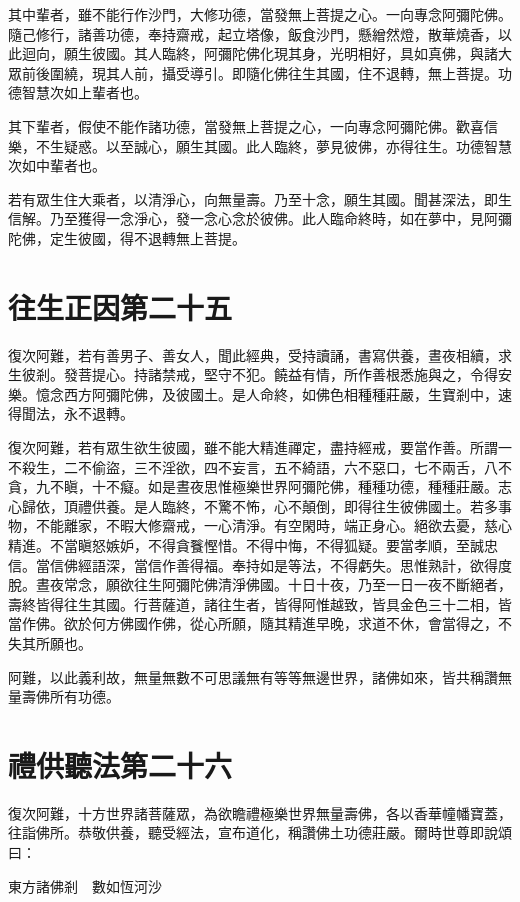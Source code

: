 \documentclass{zhvt-classic}
\begin{document}
其中輩者，雖不能行作沙門，大修功德，當發無上菩提之心。一向專念阿彌陀佛。隨己修行，諸善功德，奉持齋戒，起立塔像，飯食沙門，懸繒然燈，散華燒香，以此迴向，願生彼國。其人臨終，阿彌陀佛化現其身，光明相好，具如真佛，與諸大眾前後圍繞，現其人前，攝受導引。即隨化佛往生其國，住不退轉，無上菩提。功德智慧次如上輩者也。

其下輩者，假使不能作諸功德，當發無上菩提之心，一向專念阿彌陀佛。歡喜信樂，不生疑惑。以至誠心，願生其國。此人臨終，夢見彼佛，亦得往生。功德智慧次如中輩者也。

若有眾生住大乘者，以清淨心，向無量壽。乃至十念，願生其國。聞甚深法，即生信解。乃至獲得一念淨心，發一念心念於彼佛。此人臨命終時，如在夢中，見阿彌陀佛，定生彼國，得不退轉無上菩提。

\chapter*{往生正因第二十五}

復次阿難，若有善男子、善女人，聞此經典，受持讀誦，書寫供養，晝夜相續，求生彼剎。發菩提心。持諸禁戒，堅守不犯。饒益有情，所作善根悉施與之，令得安樂。憶念西方阿彌陀佛，及彼國土。是人命終，如佛色相種種莊嚴，生寶剎中，速得聞法，永不退轉。

復次阿難，若有眾生欲生彼國，雖不能大精進禪定，盡持經戒，要當作善。所謂一不殺生，二不偷盜，三不淫欲，四不妄言，五不綺語，六不惡口，七不兩舌，八不貪，九不瞋，十不癡。如是晝夜思惟極樂世界阿彌陀佛，種種功德，種種莊嚴。志心歸依，頂禮供養。是人臨終，不驚不怖，心不顛倒，即得往生彼佛國土。若多事物，不能離家，不暇大修齋戒，一心清淨。有空閑時，端正身心。絕欲去憂，慈心精進。不當瞋怒嫉妒，不得貪餮慳惜。不得中悔，不得狐疑。要當孝順，至誠忠信。當信佛經語深，當信作善得福。奉持如是等法，不得虧失。思惟熟計，欲得度脫。晝夜常念，願欲往生阿彌陀佛清淨佛國。十日十夜，乃至一日一夜不斷絕者，壽終皆得往生其國。行菩薩道，諸往生者，皆得阿惟越致，皆具金色三十二相，皆當作佛。欲於何方佛國作佛，從心所願，隨其精進早晚，求道不休，會當得之，不失其所願也。

阿難，以此義利故，無量無數不可思議無有等等無邊世界，諸佛如來，皆共稱讚無量壽佛所有功德。

\chapter*{禮供聽法第二十六}

復次阿難，十方世界諸菩薩眾，為欲瞻禮極樂世界無量壽佛，各以香華幢幡寶蓋，往詣佛所。恭敬供養，聽受經法，宣布道化，稱讚佛土功德莊嚴。爾時世尊即說頌曰：

東方諸佛剎　數如恆河沙
\end{document}
